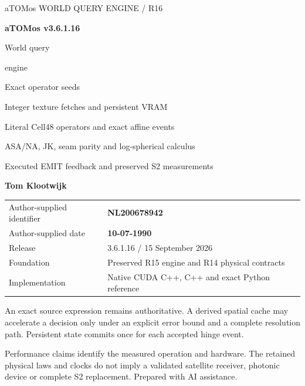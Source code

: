 

\begin{titlepage}\thispagestyle{empty}
{\sffamily\color{accent}\large aTOMos \hfill WORLD QUERY ENGINE / R16}\par
\vspace{19mm}
{\sffamily\bfseries\fontsize{40}{48}\selectfont\color{ink}aTOMos v3.6.1.16}\par
\vspace{10mm}
{\sffamily\fontsize{34}{41}\selectfont World query\par engine}\par
\vspace{10mm}
{\sffamily\fontsize{19}{25}\selectfont\color{gold}Exact operator seeds\par Integer texture fetches and persistent VRAM}\par
\vspace{12mm}
{\large Literal Cell48 operators and exact affine events\par
ASA/NA, JK, seam parity and log-spherical calculus\par
Executed EMIT feedback and preserved S2 measurements}\par
\vspace{15mm}
{\sffamily\bfseries\Large Tom Klootwijk}\par
\begin{tabular}{@{}ll@{}}
Author-supplied identifier & \textbf{NL200678942}\\
Author-supplied date & \textbf{10-07-1990}\\
Release & 3.6.1.16 / 15 September 2026\\
Foundation & Preserved R15 engine and R14 physical contracts\\
Implementation & Native CUDA C++, C++ and exact Python reference\\
\end{tabular}
\vfill
\begin{panel}
An exact source expression remains authoritative. A derived spatial cache
may accelerate a decision only under an explicit error bound and a complete
resolution path. Persistent state commits once for each accepted hinge event.
\end{panel}
{\small\color{muted}Performance claims identify the measured operation and
hardware. The retained physical laws and clocks do not imply a validated
satellite receiver, photonic device or complete S2 replacement. Prepared with AI assistance.}
\end{titlepage}
\setcounter{page}{2}

{\small\setlength{\parskip}{0pt}\tableofcontents}\clearpage




















\appendix


